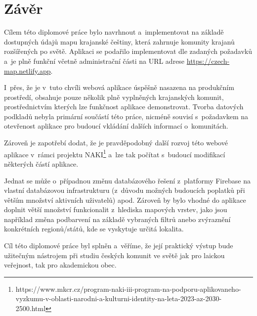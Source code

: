 \hypertarget{zuxe1vux11br}{%
\chapter*{Závěr}\label{zaver}}

Cílem této diplomové práce bylo navrhnout a~implementovat na základě dostupných údajů mapu krajanské češtiny, která zahrnuje komunity krajanů rozšířených po světě. Aplikaci se podařilo implementovat dle zadaných požadavků a~je plně funkční včetně administrační části na URL adrese \url{https://czech-map.netlify.app}.

I~přes, že je v~tuto chvíli webová aplikace úspěšně nasazena na produkčním prostředí, obsahuje pouze několik plně vyplněných krajanských komunit, prostřednictvím kterých lze funkčnost aplikace demonstrovat. Tvorba datových podkladů nebyla primární součástí této práce, nicméně souvisí s~požadavkem na otevřenost aplikace pro budoucí vkládání dalších informací o~komunitách.

Zároveň je zapotřebí dodat, že je pravděpodobný další rozvoj této webové aplikace v~rámci projektu NAKI\footnote{https://www.mkcr.cz/program-naki-iii-program-na-podporu-aplikovaneho-vyzkumu-v-oblasti-narodni-a-kulturni-identity-na-leta-2023-az-2030-2500.html} a~lze tak počítat s~budoucí modifikací některých částí aplikace.

Jednat se může o~případnou změnu databázového řešení z~platformy Firebase na vlastní databázovou infrastrukturu (z~důvodu možných budoucích poplatků při větším množství aktivních uživatelů) apod. Zároveň by bylo vhodné do aplikace doplnit větší množství funkcionalit z~hlediska mapových vrstev, jako jsou například změna podbarvení na základě vybraných filtrů anebo zvýraznění konkrétních regionů/států, kde se vyskytuje určitá lokalita.

Cíl této diplomové práce byl splněn a~věříme, že její praktický výstup bude užitečným nástrojem při studiu českých komunit ve světě jak pro laickou veřejnost, tak pro akademickou obec.
